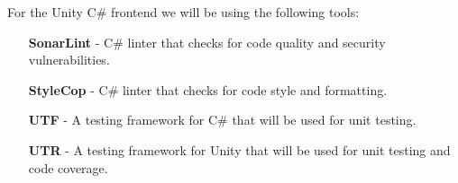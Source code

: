 \documentclass{article}
\begin{document}
\bigskip
\noindent For the Unity C\# frontend we will be using the following tools:
\begin{itemize}
  \item [\textbf{SonarLint}] - C\# linter that checks for code quality and security vulnerabilities.
  \item [\textbf{StyleCop}] - C\# linter that checks for code style and formatting.
  \item [\textbf{UTF}] - A testing framework for C\# that will be used for unit testing.
  \item [\textbf{UTR}] - A testing framework for Unity that will be used for unit testing and code coverage.
\end{itemize}
\end{document}
